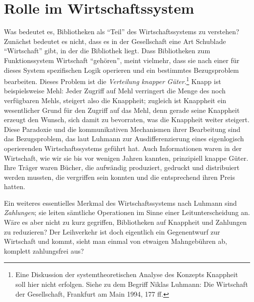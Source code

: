 \documentclass[a4paper,
fontsize=11pt,
oneside,
numbers=noperiodatend,
parskip=half-,
bibliography=totoc,
final
]{scrartcl}
\begin{document}
\hypertarget{rolle-im-wirtschaftssystem}{%
\section{Rolle im
Wirtschaftssystem}\label{rolle-im-wirtschaftssystem}}

Was bedeutet es, Bibliotheken als \enquote{Teil} des Wirtschaftssystems
zu verstehen? Zunächst bedeutet es nicht, dass es in der Gesellschaft
eine Art Schublade \enquote{Wirtschaft} gibt, in der die Bibliothek
liegt. Dass Bibliotheken zum Funktionssystem Wirtschaft
\enquote{gehören}, meint vielmehr, dass sie nach einer für dieses System
spezifischen Logik operieren und ein bestimmtes Bezugsproblem
bearbeiten. Dieses Problem ist die \emph{Verteilung knapper
Güter}.\footnote{Eine Diskussion der systemtheoretischen Analyse des
  Konzepts Knappheit soll hier nicht erfolgen. Siehe zu dem Begriff
  Niklas Luhmann: Die Wirtschaft der Gesellschaft, Frankfurt am Main
  1994, 177 ff.} Knapp ist beispielsweise Mehl: Jeder Zugriff auf Mehl
verringert die Menge des noch verfügbaren Mehls, steigert also die
Knappheit; zugleich ist Knappheit ein wesentlicher Grund für den Zugriff
auf das Mehl, denn gerade seine Knappheit erzeugt den Wunsch, sich damit
zu bevorraten, was die Knappheit weiter steigert. Diese Paradoxie und
die kommunikativen Mechanismen ihrer Bearbeitung sind das Bezugsproblem,
das laut Luhmann zur Ausdifferenzierung eines eigenlogisch operierenden
Wirtschaftssystems geführt hat. Auch Informationen waren in der
Wirtschaft, wie wir sie bis vor wenigen Jahren kannten, prinzipiell
knappe Güter. Ihre Träger waren Bücher, die aufwändig produziert,
gedruckt und distribuiert werden mussten, die vergriffen sein konnten
und die entsprechend ihren Preis hatten.

Ein weiteres essentielles Merkmal des Wirtschaftssystems nach Luhmann
sind \emph{Zahlungen}; sie leiten sämtliche Operationen im Sinne einer
Leitunterscheidung an. Wäre es aber nicht zu kurz gegriffen,
Bibliotheken auf Knappheit und Zahlungen zu reduzieren? Der Leihverkehr
ist doch eigentlich ein Gegenentwurf zur Wirtschaft und kommt, sieht man
einmal von etwaigen Mahngebühren ab, komplett zahlungsfrei aus?
\end{document}
